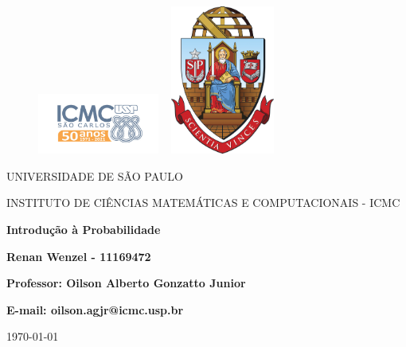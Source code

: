 \documentclass{article}
\begin{document}
\begin{figure}[ht]
	\includegraphics[width=4cm]{icmc.png}
	\hspace{7cm}
	\includegraphics[height=4.9cm,width=4cm]{brasao_usp_cor.jpg}
	\endminipage
\end{figure}

\begin{center}
	\vspace{1cm}
	\LARGE
	UNIVERSIDADE DE S\~AO PAULO

	\vspace{1.3cm}
	\LARGE
	INSTITUTO DE CI\^ENCIAS MATEM\'ATICAS E COMPUTACIONAIS - ICMC

	\vspace{1.7cm}
	\Large
	\textbf{Introdução à Probabilidade}

	\vspace{1.3cm}
	\large
	\textbf{Renan Wenzel - 11169472}

	\vspace{1.3cm}
	\large
	\textbf{Professor: Oilson Alberto Gonzatto Junior}

	\textbf{E-mail: oilson.agjr@icmc.usp.br}

	\vspace{5cm}
	\today
\end{center}
\newpage

\tableofcontents

\newpage


\newpage


\newpage


\newpage


\newpage


\newpage
\end{document}
